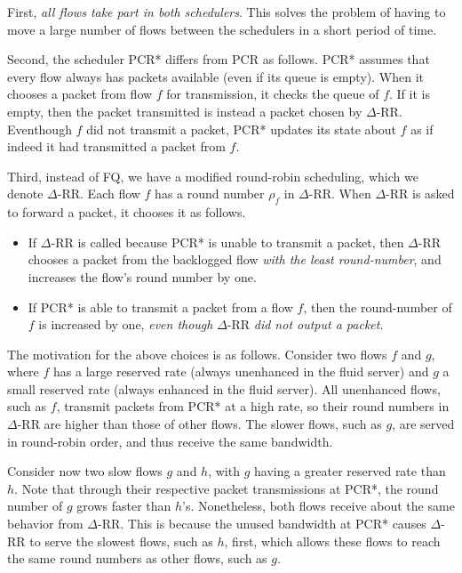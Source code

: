 \documentclass[conference]{IEEEtran}
\begin{document}
First, {\em all flows take part in both schedulers}. This solves the problem of 
having to move a large number of flows between the schedulers in a short period 
of time. 

Second, the scheduler PCR* differs from PCR as follows. PCR* assumes that every 
flow always has packets available (even if its queue is empty). When it chooses 
a packet from flow $f$ for transmission, it checks the queue of $f$. If it is 
empty, then the packet transmitted is instead a packet chosen by $\Delta$-RR.  
Eventhough $f$ did not transmit a packet, PCR* updates its state about $f$ as 
if indeed it had transmitted a packet from $f$.  

Third, instead of FQ, we have a modified round-robin scheduling, which we 
denote $\Delta$-RR. Each flow $f$ has a round number $\rho_f$ in $\Delta$-RR.  
When $\Delta$-RR is asked to forward a packet, it chooses it as follows.

\begin{itemize}
\item
If $\Delta$-RR is called because PCR* is unable to transmit a packet, then 
$\Delta$-RR chooses a packet from the backlogged flow {\em with the least 
round-number}, and increases the flow's round number by one.
\item
If PCR* is able to transmit a packet from a flow $f$, then the round-number of 
$f$ is increased by one, {\em even though} $\Delta$-RR {\em did not output a 
packet}.
\end{itemize}

The motivation for the above choices is as follows. Consider two flows $f$ and 
$g$, where $f$ has a large reserved rate (always unenhanced in the fluid 
server) and $g$ a small reserved rate (always enhanced in the fluid server).  
All unenhanced flows, such as $f$, transmit packets from PCR* at a high rate, 
so their round numbers in $\Delta$-RR are higher than those of other flows.  
The slower flows, such as $g$, are served in round-robin order, and thus 
receive the same bandwidth. 

Consider now two slow flows $g$ and $h$, with $g$ having a greater reserved 
rate than $h$.  Note that through their respective packet transmissions at 
PCR*, the round number of $g$ grows faster than $h$'s. Nonetheless, both flows 
receive about the same behavior from $\Delta$-RR. This is because the unused 
bandwidth at PCR* causes $\Delta$-RR to serve the slowest flows, such as $h$, 
first, which allows these flows to reach the same round numbers as other flows, 
such as $g$.
\end{document}
